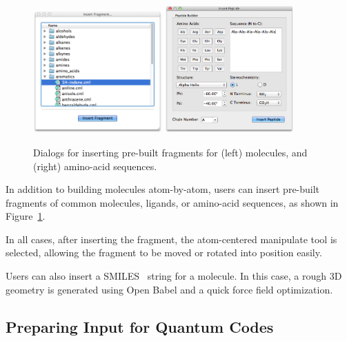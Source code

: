 \documentclass[10pt]{bmc_article}
\newenvironment{bmcformat}{\begin{raggedright}
\baselineskip20pt\sloppy\setboolean{publ}{false}}{\end{raggedright}
\baselineskip20pt\sloppy}
\begin{document}
\begin{bmcformat}
\begin{figure}
  \includegraphics[width=0.44\textwidth]{images/insert-fragment}
  \hspace{0.1cm}
  \includegraphics[width=0.44\textwidth]{images/insert-peptide}
  \caption{Dialogs for inserting pre-built fragments for (left)
    molecules, and (right) amino-acid sequences.}
  \label{f:insertdialogs}
\end{figure}

In addition to building molecules atom-by-atom, users can insert
pre-built fragments of common molecules, ligands, or amino-acid
sequences, as shown in Figure~\ref{f:insertdialogs}.

In all cases, after inserting the fragment, the atom-centered manipulate tool
is selected, allowing the fragment to be moved or rotated into
position easily.

Users can also insert a SMILES~\cite{smiles}\cite{opensmiles} string for a molecule. In
this case, a rough 3D geometry is generated using Open Babel and a
quick force field optimization.

\subsection{Preparing Input for Quantum Codes}


\end{bmcformat}
\end{document}
